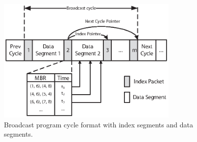 \begin{figure}[h]
\begin{center}
\includegraphics[width=3.5in]{Figures/index_packet.eps}
\caption{\small Broadcast program cycle format with index segments
and data segments.}
\label{fig:index_packet}
\end{center}
\end{figure}



